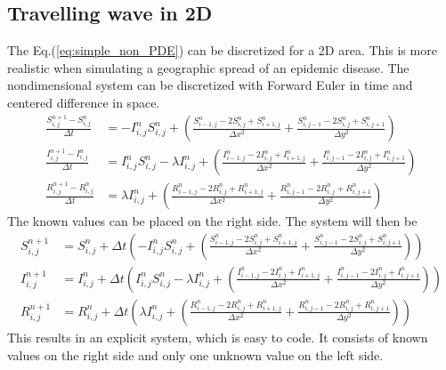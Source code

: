 \documentclass[%
twoside,                 %
final,                   %
chapterprefix=true,      %
open=right               %
10pt]{book}
\begin{document}
\subsection{Travelling wave in 2D}
The Eq.(\ref{eq:simple_non_PDE}) can be discretized for a 2D area. This is more realistic when simulating a geographic spread of an epidemic disease. The nondimensional system  can be discretized with Forward Euler in time and centered difference in space.
\begin{equation} \label{eq:SIR_disc}
	\begin{aligned}
    \frac{S^{n+1}_{i,j}-S^n_{i,j}}{\Delta t} &= -I^{n}_{i,j}S^{n}_{i,j} + \left(\frac{S^{n}_{i-1,j}-2S^{n}_{i,j}+S^{n}_{i+1,j}}{\Delta x^2}+\frac{S^{n}_{i,j-1}-2S^{n}_{i,j}+S^{n}_{i,j+1}}{\Delta y^2}\right) \\
    \frac{I^{n+1}_{i,j}-I^n_{i,j}}{\Delta t} &= I^{n}_{i,j}S^{n}_{i,j} -\lambda I^{n}_{i,j} + \left(\frac{I^{n}_{i-1,j}-2I^{n}_{i,j}+I^{n}_{i+1,j}}{\Delta x^2}+\frac{I^{n}_{i,j-1}-2I^{n}_{i,j}+I^{n}_{i,j+1}}{\Delta y^2}\right) \\
    \frac{R^{n+1}_{i,j}-R^n_{i,j}}{\Delta t} &= \lambda I^{n}_{i,j}+\left(\frac{R^{n}_{i-1,j}-2R^{n}_{i,j}+R^{n}_{i+1,j}}{\Delta x^2}+\frac{R^{n}_{i,j-1}-2R^{n}_{i,j}+R^{n}_{i,j+1}}{\Delta y^2}\right) 
	\end{aligned}
\end{equation}
The known values can be placed on the right side. The system will then be
\begin{equation}
	\begin{aligned}
    S^{n+1}_{i,j} &= S^{n}_{i,j}+\Delta t\left(-I^{n}_{i,j}S^{n}_{i,j} + \left(\frac{S^{n}_{i-1,j}-2S^{n}_{i,j}+S^{n}_{i+1,j}}{\Delta x^2}+\frac{S^{n}_{i,j-1}-2S^{n}_{i,j}+S^{n}_{i,j+1}}{\Delta y^2}\right)\right) \\
    I^{n+1}_{i,j} &= I^{n}_{i,j}+\Delta t\left(I^{n}_{i,j}S^{n}_{i,j} -\lambda I^{n}_{i,j} + \left(\frac{I^{n}_{i-1,j}-2I^{n}_{i,j}+I^{n}_{i+1,j}}{\Delta x^2}+\frac{I^{n}_{i,j-1}-2I^{n}_{i,j}+I^{n}_{i,j+1}}{\Delta y^2}\right)\right) \\
    R^{n+1}_{i,j} &= R^{n}_{i,j}+\Delta t\left(\lambda I^{n}_{i,j}+\left(\frac{R^{n}_{i-1,j}-2R^{n}_{i,j}+R^{n}_{i+1,j}}{\Delta x^2}+\frac{R^{n}_{i,j-1}-2R^{n}_{i,j}+R^{n}_{i,j+1}}{\Delta y^2}\right)\right) 
	\end{aligned}
\end{equation}
This results in an explicit system, which is easy to code. It consists of known values on the right side and only one unknown value on the left side.
\end{document}
